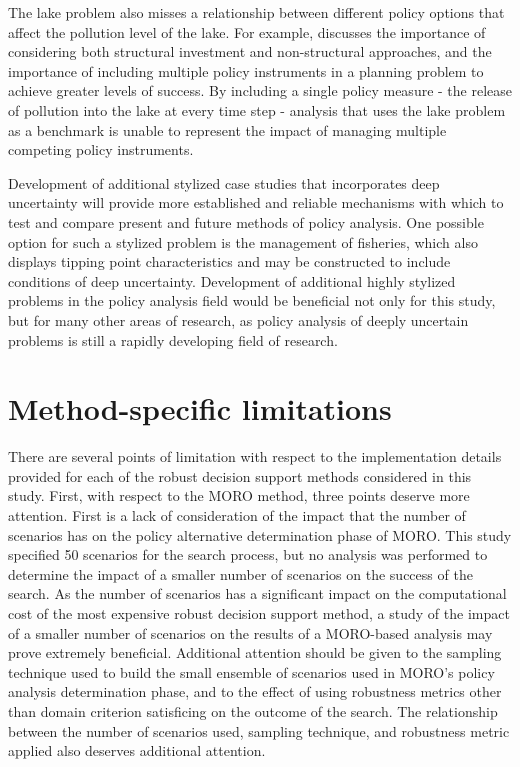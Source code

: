 The lake problem also misses a relationship between different policy options that affect the pollution level of the lake. For example, \citet{Kasprzyk2013} discusses the importance of considering both structural investment and non-structural approaches, and the importance of including multiple policy instruments in a planning problem to achieve greater levels of success. By including a single policy measure - the release of pollution into the lake at every time step - analysis that uses the lake problem as a benchmark is unable to represent the impact of managing multiple competing policy instruments. 

Development of additional stylized case studies that incorporates deep uncertainty will provide more established and reliable mechanisms with which to test and compare present and future methods of policy analysis. One possible option for such a stylized problem is the management of fisheries, which also displays tipping point characteristics and may be constructed to include conditions of deep uncertainty. Development of additional highly stylized problems in the policy analysis field would be beneficial not only for this study, but for many other areas of research, as policy analysis of deeply uncertain problems is still a rapidly developing field of research. 

\section{Method-specific limitations}
There are several points of limitation with respect to the implementation details provided for each of the robust decision support methods considered in this study. First, with respect to the MORO method, three points deserve more attention. First is a lack of consideration of the impact that the number of scenarios has on the policy alternative determination phase of MORO. This study specified 50 scenarios for the search process, but no analysis was performed to determine the impact of a smaller number of scenarios on the success of the search. As the number of scenarios has a significant impact on the computational cost of the most expensive robust decision support method, a study of the impact of a smaller number of scenarios on the results of a MORO-based analysis may prove extremely beneficial. Additional attention should be given to the sampling technique used to build the small ensemble of scenarios used in MORO's policy analysis determination phase, and to the effect of using robustness metrics other than domain criterion satisficing on the outcome of the search. The relationship between the number of scenarios used, sampling technique, and robustness metric applied also deserves additional attention. 

